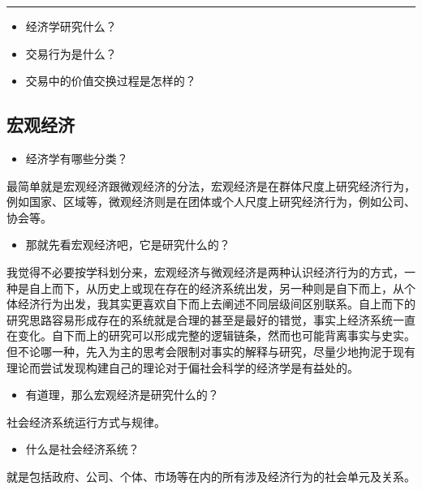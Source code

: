 \documentclass[
  letterpaper,
  DIV=11,
  numbers=noendperiod]{scrreprt}
\providecommand{\tightlist}{%
  \setlength{\itemsep}{0pt}\setlength{\parskip}{0pt}}\usepackage{longtable,booktabs,array}
\begin{document}
\begin{center}\rule{0.5\linewidth}{0.5pt}\end{center}

\begin{itemize}
\tightlist
\item
  经济学研究什么？
\item
  交易行为是什么？
\item
  交易中的价值交换过程是怎样的？
\end{itemize}

\subsection{宏观经济}\label{ux5b8fux89c2ux7ecfux6d4e}

\begin{itemize}
\tightlist
\item
  经济学有哪些分类？
\end{itemize}

最简单就是宏观经济跟微观经济的分法，宏观经济是在群体尺度上研究经济行为，例如国家、区域等，微观经济则是在团体或个人尺度上研究经济行为，例如公司、协会等。

\begin{itemize}
\tightlist
\item
  那就先看宏观经济吧，它是研究什么的？
\end{itemize}

我觉得不必要按学科划分来，宏观经济与微观经济是两种认识经济行为的方式，一种是自上而下，从历史上或现在存在的经济系统出发，另一种则是自下而上，从个体经济行为出发，我其实更喜欢自下而上去阐述不同层级间区别联系。自上而下的研究思路容易形成存在的系统就是合理的甚至是最好的错觉，事实上经济系统一直在变化。自下而上的研究可以形成完整的逻辑链条，然而也可能背离事实与史实。但不论哪一种，先入为主的思考会限制对事实的解释与研究，尽量少地拘泥于现有理论而尝试发现构建自己的理论对于偏社会科学的经济学是有益处的。

\begin{itemize}
\tightlist
\item
  有道理，那么宏观经济是研究什么的？
\end{itemize}

社会经济系统运行方式与规律。

\begin{itemize}
\tightlist
\item
  什么是社会经济系统？
\end{itemize}

就是包括政府、公司、个体、市场等在内的所有涉及经济行为的社会单元及关系。
\end{document}
